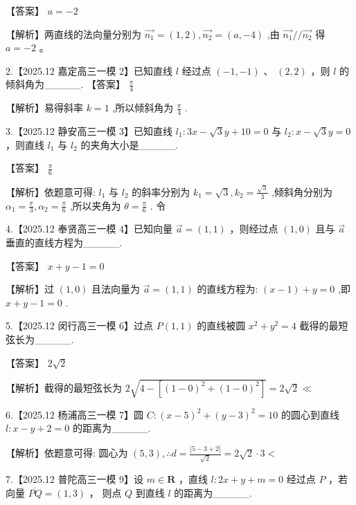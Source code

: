 \documentclass[10pt]{article}
\begin{document}
【答案】 \(a =  - 2\)

【解析】两直线的法向量分别为 \(\overrightarrow{{n}_{1}} = \left( {1,2}\right) ,\overrightarrow{{n}_{2}} = \left( {a, - 4}\right)\) ,由 \(\overrightarrow{{n}_{1}}//\overrightarrow{{n}_{2}}\) 得 \(a =  - 2\) 。

2.【2025.12 嘉定高三一模 2】已知直线 \(l\) 经过点 \(\left( {-1, - 1}\right)\) 、 \(\left( {2,2}\right)\) ，则 \(l\) 的倾斜角为\_\_\_\_\_. 【答案】 \(\frac{\pi }{4}\)

【解析】易得斜率 \(k = 1\) ,所以倾斜角为 \(\frac{\pi }{4}\) .

3.【2025.12 静安高三一模 3】已知直线 \({l}_{1} : {3x} - \sqrt{3}y + {10} = 0\) 与 \({l}_{2} : x - \sqrt{3}y = 0\) ，则直线 \({l}_{1}\) 与 \({l}_{2}\) 的夹角大小是\_\_\_\_\_.

【答案】 \(\frac{\pi }{6}\)

【解析】依题意可得: \({l}_{1}\) 与 \({l}_{2}\) 的斜率分别为 \({k}_{1} = \sqrt{3},{k}_{2} = \frac{\sqrt{3}}{3}\) ,倾斜角分别为 \({\alpha }_{1} = \frac{\pi }{3},{\alpha }_{2} = \frac{\pi }{6}\) ,所以夹角为 \(\theta  = \frac{\pi }{6}\) . 令

4.【2025.12 奉贤高三一模 4】已知向量 \(\overrightarrow{a} = \left( {1,1}\right)\) ，则经过点 \(\left( {1,0}\right)\) 且与 \(\overrightarrow{a}\) 垂直的直线方程为\_\_\_\_\_.

【答案】 \(x + y - 1 = 0\)

【解析】过 \(\left( {1,0}\right)\) 且法向量为 \(\overrightarrow{a} = \left( {1,1}\right)\) 的直线方程为: \(\left( {x - 1}\right)  + y = 0\) ,即 \(x + y - 1 = 0\) .

5.【2025.12 闵行高三一模 6】过点 \(P\left( {1,1}\right)\) 的直线被圆 \({x}^{2} + {y}^{2} = 4\) 截得的最短弦长为\_\_\_\_\_.

【答案】 \(2\sqrt{2}\)

【解析】截得的最短弦长为 \(2\sqrt{4 - \left\lbrack  {{\left( 1 - 0\right) }^{2} + {\left( 1 - 0\right) }^{2}}\right\rbrack  } = 2\sqrt{2} \ll\)

6.【2025.12 杨浦高三一模 7】圆 \(C : {\left( x - 5\right) }^{2} + {\left( y - 3\right) }^{2} = {10}\) 的圆心到直线 \(l : x - y + 2 = 0\) 的距离为\_\_\_\_\_.

【解析】依题意可得: 圆心为 \(\left( {5,3}\right) ,\therefore d = \frac{\left| 5 - 3 + 2\right| }{\sqrt{2}} = 2\sqrt{2} \cdot  3 <\)

7.【2025.12 普陀高三一模 9】设 \(m \in  \mathbf{R}\) ，直线 \(l : {2x} + y + m = 0\) 经过点 \(P\) ，若向量 \(\overline{PQ} = \left( {1,3}\right)\) ， 则点 \(Q\) 到直线 \(l\) 的距离为\_\_\_\_\_.
\end{document}
